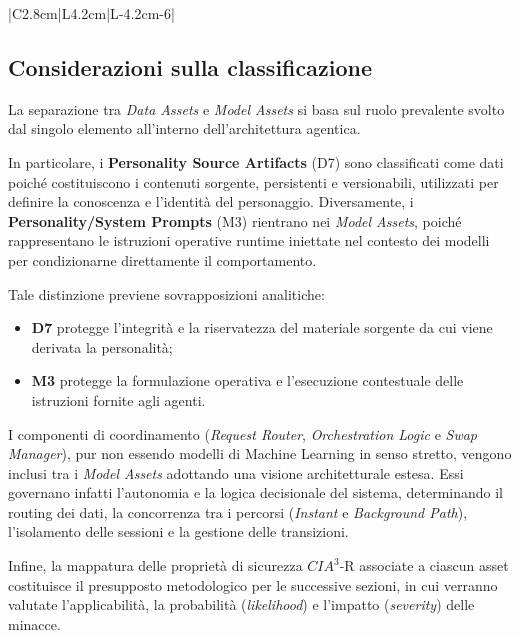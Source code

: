 \documentclass[11pt,a4paper]{article}
\begin{document}
\begin{longtable}{|C{2.8cm}|L{4.2cm}|L{\dimexpr\textwidth-2.8cm-4.2cm-6\arrayrulewidth\relax}|}
\end{longtable}
\endgroup

\subsection{Considerazioni sulla classificazione}
\label{subsec:asset-classification-notes}

La separazione tra \textit{Data Assets} e \textit{Model Assets} si basa sul ruolo
prevalente svolto dal singolo elemento all'interno dell'architettura agentica.

In particolare, i \textbf{Personality Source Artifacts} (D7) sono classificati come dati
poiché costituiscono i contenuti sorgente, persistenti e versionabili, utilizzati per
definire la conoscenza e l'identità del personaggio. Diversamente, i 
\textbf{Personality/System Prompts} (M3) rientrano nei \textit{Model Assets}, poiché rappresentano le istruzioni operative runtime
iniettate nel contesto dei modelli per condizionarne direttamente il comportamento.

Tale distinzione previene sovrapposizioni analitiche:
\begin{itemize}
    \item \textbf{D7} protegge l'integrità e la riservatezza del materiale sorgente da cui viene derivata la personalità;
    \item \textbf{M3} protegge la formulazione operativa e l'esecuzione contestuale delle istruzioni fornite agli agenti.
\end{itemize}

I componenti di coordinamento (\textit{Request Router}, \textit{Orchestration Logic} e \textit{Swap Manager}), pur non essendo modelli di Machine Learning in senso stretto, vengono inclusi tra i \textit{Model Assets} adottando una visione architetturale estesa. Essi governano infatti l'autonomia e la logica decisionale del sistema, determinando il routing dei dati, la concorrenza tra i percorsi (\textit{Instant} e \textit{Background Path}), l'isolamento delle sessioni e la gestione delle transizioni.

Infine, la mappatura delle proprietà di sicurezza $CIA^3$-R associate a ciascun asset costituisce il presupposto metodologico per le successive sezioni, in cui verranno valutate l'applicabilità, la probabilità (\textit{likelihood}) e l'impatto (\textit{severity}) delle minacce.
\end{document}
